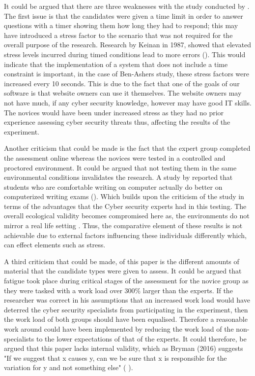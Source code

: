 It could be argued that there are three weaknesses with the study conducted by \citeauthor{ben2015effects}. The first issue is that the candidates were given a time limit in order to answer questions with a timer showing them how long they had to respond; this may have introduced a stress factor to the scenario that was not required for the overall purpose of the research. Research by Keinan in 1987, showed that elevated stress levels incurred during timed conditions lead to more errors (\cite{Keinan}). This would indicate that the implementation of a system that does not include a time constraint is important, in the case of Ben-Ashers study, these stress factors were increased every 10 seconds. This is due to the fact that one of the goals of our software is that website owners can use it themselves. The website owners may not have much, if any cyber security knowledge, however may have good IT skills. The novices would have been under increased stress as they had no prior experience assessing cyber security threats thus, affecting the results of the experiment.

Another criticism that could be made is the fact that the expert group completed the assessment online whereas the novices were tested in a controlled and proctored environment. It could be argued that not testing them in the same environmental conditions invalidates the research. A study by \citeauthor{russell2003computer} reported that students who are comfortable writing on computer actually do better on computerized writing exams (\cite{russell2003computer}). Which builds upon the criticism of the study in terms of the advantages that the Cyber security experts had in this testing. The overall ecological validity becomes compromised here as, the environments do not mirror a real life setting \cite{bryman_2016}. Thus, the comparative element of these results is not achievable due to external factors influencing these individuals differently which, can effect elements such as stress.

A third criticism that could be made, of this paper is the different amounts of material that the candidate types were given to assess. It could be argued that fatigue took place during critical stages of the assessment for the novice group as they were tasked with a work load over 300\% larger than the experts. If the researcher was correct in his assumptions that an increased work load would have deterred the cyber security specialists from participating in the experiment, then the work load of both groups should have been equalised. Therefore a reasonable work around could have been implemented by reducing the work load of the non-specialists to the lower expectations of that of the experts. It could therefore, be argued that this paper lacks internal validity, which as Bryman (2016) suggests "If we suggest that x causes y, can we be sure that x is responsible for the variation for y and not something else" (\citeauthor{bryman_2016} \citeyear{bryman_2016}).

